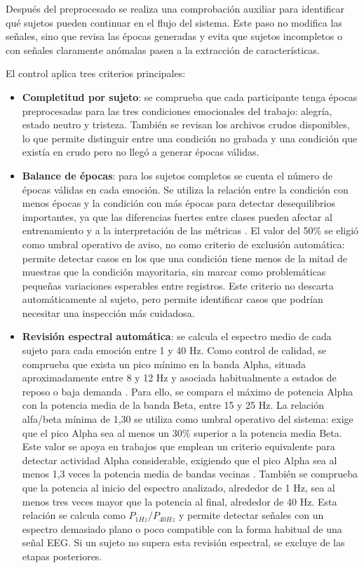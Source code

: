 Después del preprocesado se realiza una comprobación auxiliar para identificar qué sujetos pueden continuar en el flujo del sistema. Este paso no modifica las señales, sino que revisa las épocas generadas y evita que sujetos incompletos o con señales claramente anómalas pasen a la extracción de características.

El control aplica tres criterios principales:

\begin{itemize}
    \item \textbf{Completitud por sujeto}: se comprueba que cada participante tenga épocas preprocesadas para las tres condiciones emocionales del trabajo: alegría, estado neutro y tristeza. También se revisan los archivos crudos disponibles, lo que permite distinguir entre una condición no grabada y una condición que existía en crudo pero no llegó a generar épocas válidas.
    \item \textbf{Balance de épocas}: para los sujetos completos se cuenta el número de épocas válidas en cada emoción. Se utiliza la relación entre la condición con menos épocas y la condición con más épocas para detectar desequilibrios importantes, ya que las diferencias fuertes entre clases pueden afectar al entrenamiento y a la interpretación de las métricas \cite{he2009learning}. El valor del 50\% se eligió como umbral operativo de aviso, no como criterio de exclusión automática: permite detectar casos en los que una condición tiene menos de la mitad de muestras que la condición mayoritaria, sin marcar como problemáticas pequeñas variaciones esperables entre registros. Este criterio no descarta automáticamente al sujeto, pero permite identificar casos que podrían necesitar una inspección más cuidadosa.
    \item \textbf{Revisión espectral automática}: se calcula el espectro medio de cada sujeto para cada emoción entre 1 y 40 Hz. Como control de calidad, se comprueba que exista un pico mínimo en la banda Alpha, situada aproximadamente entre 8 y 12 Hz y asociada habitualmente a estados de reposo o baja demanda \cite{alarcao2019eeg}. Para ello, se compara el máximo de potencia Alpha con la potencia media de la banda Beta, entre 15 y 25 Hz. La relación alfa/beta mínima de 1,30 se utiliza como umbral operativo del sistema: exige que el pico Alpha sea al menos un 30\% superior a la potencia media Beta. Este valor se apoya en trabajos que emplean un criterio equivalente para detectar actividad Alpha considerable, exigiendo que el pico Alpha sea al menos 1,3 veces la potencia media de bandas vecinas \cite{difronso2019dryeeg}. También se comprueba que la potencia al inicio del espectro analizado, alrededor de 1 Hz, sea al menos tres veces mayor que la potencia al final, alrededor de 40 Hz. Esta relación se calcula como \(P_{1Hz}/P_{40Hz}\) y permite detectar señales con un espectro demasiado plano o poco compatible con la forma habitual de una señal \ac{EEG}. Si un sujeto no supera esta revisión espectral, se excluye de las etapas posteriores.
\end{itemize}

